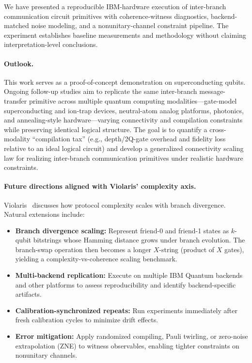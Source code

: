 \documentclass[11pt]{article}
\begin{document}
We have presented a reproducible IBM-hardware execution of inter-branch communication circuit primitives with coherence-witness diagnostics, backend-matched noise modeling, and a nonunitary-channel constraint pipeline. The experiment establishes baseline measurements and methodology without claiming interpretation-level conclusions.

\paragraph{Outlook.} 
This work serves as a proof-of-concept demonstration on superconducting qubits. Ongoing follow-up studies aim to replicate the same inter-branch message-transfer primitive across multiple quantum computing modalities---gate-model superconducting and ion-trap devices, neutral-atom analog platforms, photonics, and annealing-style hardware---varying connectivity and compilation constraints while preserving identical logical structure. The goal is to quantify a cross-modality ``compilation tax'' (e.g., depth/2Q-gate overhead and fidelity loss relative to an ideal logical circuit) and develop a generalized connectivity scaling law for realizing inter-branch communication primitives under realistic hardware constraints.

\paragraph{Future directions aligned with Violaris' complexity axis.}
Violaris~\cite{violaris2026interbranch} discusses how protocol complexity scales with branch divergence. Natural extensions include:
\begin{itemize}
    \item \textbf{Branch divergence scaling:} Represent friend-0 and friend-1 states as $k$-qubit bitstrings whose Hamming distance grows under branch evolution. The branch-swap operation then becomes a longer $X$-string (product of $X$ gates), yielding a complexity-vs-coherence scaling benchmark.
    \item \textbf{Multi-backend replication:} Execute on multiple IBM Quantum backends and other platforms to assess reproducibility and identify backend-specific artifacts.
    \item \textbf{Calibration-synchronized repeats:} Run experiments immediately after fresh calibration cycles to minimize drift effects.
    \item \textbf{Error mitigation:} Apply randomized compiling, Pauli twirling, or zero-noise extrapolation (ZNE) to witness observables, enabling tighter constraints on nonunitary channels.
\end{itemize}
\end{document}
